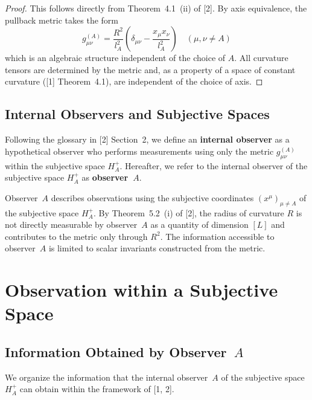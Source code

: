 \documentclass[a4paper,11pt]{article}
\theoremstyle{definition}
\begin{document}
\begin{proof}
This follows directly from Theorem~4.1~(ii) of {[2]}. By axis equivalence, the pullback metric takes the form
\begin{equation}
g_{\mu\nu}^{(A)} = \frac{R^2}{l_A^2}\left(\delta_{\mu\nu} - \frac{x_\mu x_\nu}{l_A^2}\right) \quad (\mu, \nu \neq A) \tag{2.4}
\end{equation}
which is an algebraic structure independent of the choice of \(A\). All curvature tensors are determined by the metric and, as a property of a space of constant curvature ({[1]} Theorem~4.1), are independent of the choice of axis.
\end{proof}

\subsection{Internal Observers and Subjective Spaces}

Following the glossary in {[2]} Section~2, we define an \textbf{internal observer} as a hypothetical observer who performs measurements using only the metric \(g_{\mu\nu}^{(A)}\) within the subjective space \(H_A^+\). Hereafter, we refer to the internal observer of the subjective space \(H_A^+\) as \textbf{observer~\(A\)}.

Observer~\(A\) describes observations using the subjective coordinates \((x^\mu)_{\mu \neq A}\) of the subjective space \(H_A^+\). By Theorem~5.2~(i) of {[2]}, the radius of curvature \(R\) is not directly measurable by observer~\(A\) as a quantity of dimension \([L]\) and contributes to the metric only through \(R^2\). The information accessible to observer~\(A\) is limited to scalar invariants constructed from the metric.

\section{Observation within a Subjective Space}

\subsection{Information Obtained by Observer~\(A\)}

We organize the information that the internal observer~\(A\) of the subjective space \(H_A^+\) can obtain within the framework of {[1, 2]}.
\end{document}
